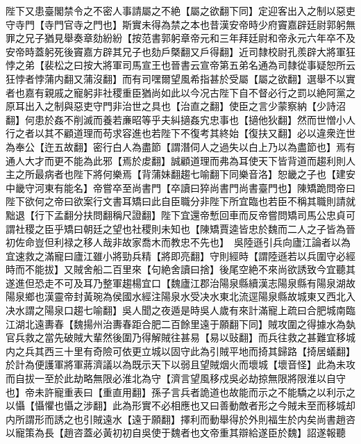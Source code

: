 陛下又患臺閣禁令之不密人事請屬之不絶【屬之欲翻下同】定迎客出入之制以惡吏守寺門【寺門官寺之門也】斯實未得為禁之本也昔漢安帝時少府竇嘉辟廷尉郭躬無罪之兄子猶見舉奏章劾紛紛【按范書郭躬章帝元和三年拜廷尉和帝永元六年卒不及安帝時蓋躬死後竇嘉方辟其兄子也劾戶槩翻又戶得翻】近司隸校尉孔羨辟大將軍狂悖之弟【裴松之曰按大將軍司馬宣王也晉書云宣帝第五弟名通為司隸從事疑恕所云狂悖者悖蒲内翻又蒲沒翻】而有司嘿爾望風希指甚於受屬【屬之欲翻】選舉不以實者也嘉有親戚之寵躬非社稷重臣猶尚如此以今况古陛下自不督必行之罰以絶阿黨之原耳出入之制與惡吏守門非治世之具也【治直之翻】使臣之言少蒙察納【少詩沼翻】何患於姦不削滅而養若亷昭等乎夫糾擿姦宄忠事也【擿他狄翻】然而世憎小人行之者以其不顧道理而苟求容進也若陛下不復考其終始【復扶又翻】必以違衆迕世為奉公【迕五故翻】密行白人為盡節【謂潛伺人之過失以白上乃以為盡節也】焉有通人大才而更不能為此邪【焉於䖍翻】誠顧道理而弗為耳使天下皆背道而趨利則人主之所最病者也陛下將何樂焉【背蒲妹翻趨七喻翻下同樂音洛】恕畿之子也【建安中畿守河東有能名】帝嘗卒至尚書門【卒讀曰猝尚書門尚書臺門也】陳矯跪問帝曰陛下欲何之帝曰欲案行文書耳矯曰此自臣職分非陛下所宜臨也若臣不稱其職則請就黜退【行下孟翻分扶問翻稱尺證翻】陛下宜還帝慙回車而反帝嘗問矯司馬公忠貞可謂社稷之臣乎矯曰朝廷之望也社稷則未知也【陳矯賈逵皆忠於魏而二人之子皆為晉初佐命豈但利禄之移人哉非故家喬木而教忠不先也】　吳陸遜引兵向廬江論者以為宜速救之滿寵曰廬江雖小將勁兵精【將即亮翻】守則經時【謂陸遜若以兵圍守必經時而不能拔】又賊舍船二百里來【句絶舍讀曰捨】後尾空絶不來尚欲誘致今宜聽其遂進但恐走不可及耳乃整軍趨楊宜口【魏廬江郡治陽泉縣續漢志陽泉縣有陽泉湖故陽泉鄉也漢靈帝封黃琬為侯國水經注陽泉水受决水東北流逕陽泉縣故城東又西北入决水謂之陽泉口趨七喻翻】吳人聞之夜遁是時吳人歲有來計滿寵上疏曰合肥城南臨江湖北遠夀春【魏揚州治夀春距合肥二百餘里遠于願翻下同】賊攻圍之得據水為埶官兵救之當先破賊大輩然後圍乃得解賊往甚易【易以䜴翻】而兵往救之甚難宜移城内之兵其西三十里有奇險可依更立城以固守此為引賊平地而掎其歸路【掎居蟻翻】於計為便護軍將軍蔣濟議以為既示天下以弱且望賊烟火而壞城【壞音怪】此為未攻而自拔一至於此劫略無限必淮北為守【濟言望風移戍吳必劫掠無限將限淮以自守也】帝未許寵重表曰【重直用翻】孫子言兵者詭道也故能而示之不能驕之以利示之以懾【懾懼也懾之涉翻】此為形實不必相應也又曰善動敵者形之今賊未至而移城却内所謂形而誘之也引賊遠水【遠于願翻】擇利而動舉得於外則福生於内矣尚書趙咨以寵策為長【趙咨蓋必黃初初自吳使于魏者也文帝重其辯給遂臣於魏】詔遂報聽

